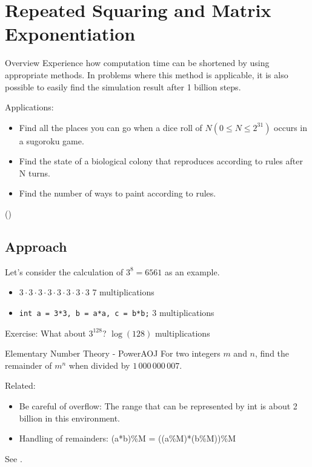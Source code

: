  \chapter{Repeated Squaring and Matrix Exponentiation}\label{chapter:rsquares}

\begin{itembox}[l]{Overview}
Experience how computation time can be shortened by using appropriate methods.
In problems where this method is applicable, it is also possible to easily find the simulation result after 1 billion steps.

Applications:
    \begin{itemize}
\setlength{\itemsep}{0pt}
    \item Find all the places you can go when a dice roll of $N (0\le N\le {2^{31}})$ occurs in a sugoroku game.
    \item Find the state of a biological colony that reproduces according to rules after N turns.
    \item Find the number of ways to paint according to rules.
    \end{itemize}
(\pccbook[p.~114])
\end{itembox}
\section{Approach}

Let's consider the calculation of $3^8 = 6561$ as an example.
\begin{itemize}
\setlength{\itemsep}{0pt}
\item $3\cdot{}3\cdot{}3\cdot{}3\cdot{}3\cdot{}3\cdot{}3\cdot{}3$ \dingright{} 7 multiplications
\item \texttt{int a = 3*3, b = a*a, c = b*b;} \dingright{} 3 multiplications
\end{itemize}

Exercise: What about $3^{128}$? \dingright{} $\log(128)$ multiplications

\begin{psbox}{Elementary Number Theory - Power}{AOJ}
For two integers $m$ and $n$, find the remainder of $m^n$ when divided by $1\,000\,000\,007$.

\end{psbox}

Related:
\begin{itemize}
\setlength{\itemsep}{0pt}
\item Be careful of overflow: The range that can be represented by int is about 2 billion in this environment.
\item Handling of remainders: (a*b)\%M = ((a\%M)*(b\%M))\%M
\end{itemize}
See \pcaojbook[pp.~445--].

